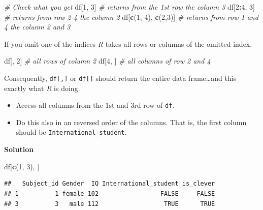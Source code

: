 \documentclass[
]{scrartcl}
\makeatletter
\newenvironment{Shaded}{\begin{snugshade}}{\end{snugshade}}
\newcommand{\CommentTok}[1]{\textcolor[rgb]{0.56,0.35,0.01}{\textit{#1}}}
\newcommand{\DecValTok}[1]{\textcolor[rgb]{0.00,0.00,0.81}{#1}}
\newcommand{\KeywordTok}[1]{\textcolor[rgb]{0.13,0.29,0.53}{\textbf{#1}}}
\newcommand{\NormalTok}[1]{#1}
\newcommand{\OperatorTok}[1]{\textcolor[rgb]{0.81,0.36,0.00}{\textbf{#1}}}
\providecommand{\tightlist}{%
  \setlength{\itemsep}{0pt}\setlength{\parskip}{0pt}}
\newenvironment{kframe}{%
\medskip{}
\setlength{\fboxsep}{.8em}
 \def\at@end@of@kframe{}%
 \ifinner\ifhmode%
  \def\at@end@of@kframe{\end{minipage}}%
  \begin{minipage}{\columnwidth}%
 \fi\fi%
 \def\FrameCommand##1{\hskip\@totalleftmargin \hskip-\fboxsep
 \colorbox{shadecolor}{##1}\hskip-\fboxsep
     \hskip-\linewidth \hskip-\@totalleftmargin \hskip\columnwidth}%
 \MakeFramed {\advance\hsize-\width
   \@totalleftmargin\z@ \linewidth\hsize
   \@setminipage}}%
 {\par\unskip\endMakeFramed%
 \at@end@of@kframe}
\newenvironment{rmdblock}[1]
  {
  \begin{itemize}
  \renewcommand{\labelitemi}{
    \raisebox{-.7\height}[0pt][0pt]{
      {\setkeys{Gin}{width=3em,keepaspectratio}\texttt{[image: images/\#1]}}
    }
  }
  \setlength{\fboxsep}{1em}
  \begin{kframe}
  \item
  }
  {
  \end{kframe}
  \end{itemize}
  }
\newenvironment{myexercise}
    {\begin{rmdblock}{exercise_green}}
    {\end{rmdblock}}
\newenvironment{webexsolution}[1]
    {\par\tiny\textbf{#1}}
    {\par}
\newcommand{\webexhide}[1]{\begin{webexsolution}{#1}}
\makeatother
\begin{document}
\begin{Shaded}
\begin{Highlighting}[]
\CommentTok{\# Check what you get}
\NormalTok{df[}\DecValTok{1}\NormalTok{, }\DecValTok{3}\NormalTok{]             }\CommentTok{\# returns from the 1st row the column 3}
\NormalTok{df[}\DecValTok{2}\OperatorTok{:}\DecValTok{4}\NormalTok{, }\DecValTok{3}\NormalTok{]           }\CommentTok{\# returns from row 2{-}4 the column 2}
\NormalTok{df[}\KeywordTok{c}\NormalTok{(}\DecValTok{1}\NormalTok{, }\DecValTok{4}\NormalTok{), }\KeywordTok{c}\NormalTok{(}\DecValTok{2}\NormalTok{,}\DecValTok{3}\NormalTok{)]  }\CommentTok{\# returns from row 1 and 4 the column 2 and 3}
\end{Highlighting}
\end{Shaded}

If you omit one of the indices \emph{R} takes all rows or columns of the omitted index.

\begin{Shaded}
\begin{Highlighting}[]
\NormalTok{df[, }\DecValTok{2}\NormalTok{]    }\CommentTok{\# all rows of column 2}
\NormalTok{df[}\DecValTok{4}\NormalTok{, ]    }\CommentTok{\# all columns of row 2 and 4}
\end{Highlighting}
\end{Shaded}

Consequently, \texttt{df{[},{]}} or \texttt{df{[}{]}} should return the entire data frame\ldots and this exactly what \emph{R} is doing.

\begin{myexercise}
\begin{itemize}
\tightlist
\item
  Access all columns from the 1st and 3rd row of \texttt{df}.
\item
  Do this also in an reversed order of the columns. That is, the first
  column should be \texttt{International\_student}.
\end{itemize}
\end{myexercise}
\webexhide{Solution}

\begin{Shaded}
\begin{Highlighting}[]
\NormalTok{df[}\KeywordTok{c}\NormalTok{(}\DecValTok{1}\NormalTok{, }\DecValTok{3}\NormalTok{), ]}
\end{Highlighting}
\end{Shaded}

\begin{verbatim}
##   Subject_id Gender  IQ International_student is_clever
## 1          1 female 102                 FALSE     FALSE
## 3          3   male 112                  TRUE      TRUE
\end{verbatim}
\end{document}
